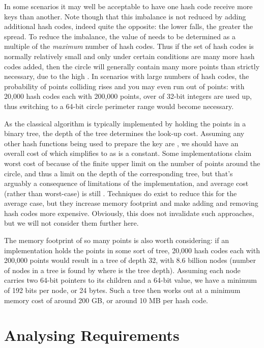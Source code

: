 \documentclass[runningheads,a4paper]{llncs}
\begin{document}
In some scenarios it may well be acceptable to have one hash code
receive  more keys than another. Note though that this imbalance
is not reduced by adding additional hash codes, indeed quite the
opposite: the lower  falls, the greater the spread. To reduce
the imbalance, the value of  needs to be determined as a multiple
of the {\em maximum} number of hash codes. Thus if the set of hash
codes is normally relatively small and only under certain conditions
are many more hash codes added, then the circle will generally contain
many more points than strictly necessary, due to the high . In
scenarios with large numbers of hash codes, the probability of points
colliding rises and you may even run out of points: with 20,000 hash
codes each with 200,000 points, over  of 32-bit integers are
used up, thus switching to a 64-bit circle perimeter range would
become necessary.

As the classical algorithm is typically implemented by holding the
points in a binary tree, the depth of the tree determines the look-up
cost. Assuming any other hash functions being used to prepare the key
are , we should have an overall cost of  which simplifies to  as  is a
constant. Some implementations claim worst cost of  because
of the finite upper limit on the number of points around the circle,
and thus a limit on the depth of the corresponding tree, but that's
arguably a consequence of limitations of the implementation, and
average cost (rather than worst-case) is still
. Techniques do exist to reduce this for the
average case, but they increase memory footprint and make adding and
removing hash codes more expensive. Obviously, this does not
invalidate such approaches, but we will not consider them further
here.

The memory footprint of so many points is also worth considering: if
an implementation holds the points in some sort of tree, 20,000 hash
codes each with 200,000 points would result in a tree of depth 32,
with 8.6 billion nodes (number of nodes in a tree is found by  where  is the tree depth). Assuming each node carries two
64-bit pointers to its children and a 64-bit value, we have a minimum
of 192 bits per node, or 24 bytes. Such a tree then works out at a
minimum memory cost of around 200 GB, or around 10 MB per hash code.

\section{Analysing Requirements}
\end{document}
